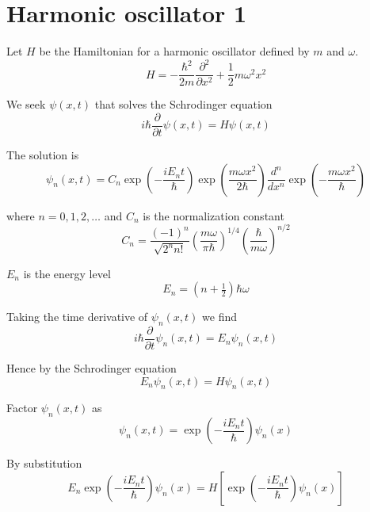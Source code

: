 

\section*{Harmonic oscillator 1}

Let $H$ be the Hamiltonian for a harmonic oscillator defined by $m$ and $\omega$.
\begin{equation*}
H=-\frac{\hbar^2}{2m}\frac{\partial^2}{\partial x^2}+\frac{1}{2}m\omega^2x^2
\end{equation*}

We seek $\psi(x,t)$ that solves the Schrodinger equation
\begin{equation*}
i\hbar\frac{\partial}{\partial t}\psi(x,t)=H\psi(x,t)
\end{equation*}

The solution is
\begin{equation*}
\psi_n(x,t)=C_n\exp\left(-\frac{iE_nt}{\hbar}\right)
\exp\left(\frac{m\omega x^2}{2\hbar}\right)
\frac{d^n}{dx^n}\exp\left(-\frac{m\omega x^2}{\hbar}\right)
\end{equation*}

where $n=0,1,2,\ldots$ and $C_n$ is the normalization constant
\begin{equation*}
C_n=\frac{(-1)^n}{\sqrt{2^nn!}}
\left(\frac{m\omega}{\pi\hbar}\right)^{1/4}
\left(\frac{\hbar}{m\omega}\right)^{n/2}
\end{equation*}

$E_n$ is the energy level
\begin{equation*}
E_n=\left(n+\tfrac{1}{2}\right)\hbar\omega
\end{equation*}

Taking the time derivative of $\psi_n(x,t)$ we find
\begin{equation*}
i\hbar\frac{\partial}{\partial t}\psi_n(x,t)=E_n\psi_n(x,t)
\end{equation*}

Hence by the Schrodinger equation
\begin{equation*}
E_n\psi_n(x,t)=H\psi_n(x,t)
\end{equation*}

Factor $\psi_n(x,t)$ as
\begin{equation*}
\psi_n(x,t)=\exp\left(-\frac{iE_nt}{\hbar}\right)\psi_n(x)
\end{equation*}

By substitution
\begin{equation*}
E_n\exp\left(-\frac{iE_nt}{\hbar}\right)\psi_n(x)
=H\left[\exp\left(-\frac{iE_nt}{\hbar}\right)\psi_n(x)\right]
\end{equation*}

